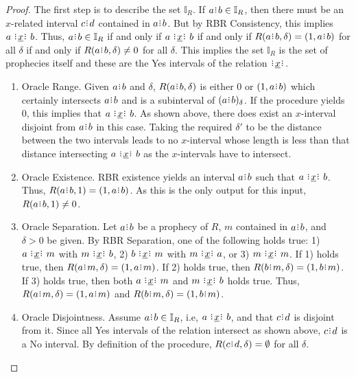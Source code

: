 \documentclass[12pt]{article}
\begin{document}
\begin{proof}

    The first step is to describe the set $\mathbb{I}_R$. If $a\rint b \in \mathbb{I}_R$, then there must be an $x$-related interval $c\rint d$ contained in $a\rint b$. But by RBR Consistency, this implies $a \xrel b$. Thus, $a\rint b \in \mathbb{I}_R$ if and only if $a \xrel b$ if and only if $R(a\rint b, \delta) = (1, a\rint b)$ for all $\delta$ if and only if $R(a\rint b, \delta) \neq 0$ for all $\delta$. This implies the set $\mathbb{I}_R$ is the set of prophecies itself and these are the Yes intervals of the relation $\xrel$. 

    \begin{enumerate}
        \item Oracle Range. Given $a\rint b$ and $\delta$, $R(a\rint b, \delta)$ is either $0$ or $(1, a\rint b)$ which certainly intersects $a\rint b$ and is a subinterval  of $\halo{a\rint b}$. If the procedure yields $0$, this implies that \sout{$a \xrel b$}. As shown above, there does exist an $x$-interval disjoint from $a\rint b$ in this case. Taking the required $\delta'$ to be the distance between the two intervals leads to no $x$-interval whose length is less than that distance intersecting $a \xrel b$ as the $x$-intervals have to intersect. 
        
        \item Oracle Existence. RBR existence yields an interval $a\rint b$ such that $a \xrel b$. Thus, $R(a\rint b, 1) = (1, a\rint b)$. As this is the only output for this input, $R(a\rint b, 1) \neq 0$. 
        
        \item Oracle Separation. Let $a\rint b$ be a prophecy of $R$, $m$ contained in $a\rint b$, and $\delta >0$ be given. 
        By RBR Separation, one of the following holds true: 1) $a \xrel m$ with \sout{$m \xrel b$}, 2) $b \xrel m$ with \sout{$m \xrel a$}, or 3) $m \xrel m$.  If 1) holds true, then $R(a\rint m, \delta) = (1, a\rint m)$. If 2) holds true, then $R(b\rint m,\delta) = (1, b\rint m)$.  If 3) holds true, then both $a \xrel m$ and $m \xrel b$ holds true. Thus, $R(a\rint m, \delta) = (1, a\rint m)$ and $R(b\rint m, \delta) = (1, b\rint m)$. 

        \item Oracle Disjointness. Assume $a\rint b \in \mathbb{I}_R$, i.e, $a \xrel b$, and that $c\rint d$ is disjoint from it. Since all Yes intervals of the relation intersect as shown above, $c\rint d$ is a No interval. By definition of the procedure, $R(c\rint d, \delta) = \emptyset$ for all $\delta$. 
        

\end{enumerate}
\end{proof}
\end{document}
